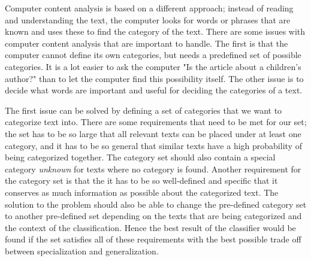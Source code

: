 \documentclass[english,a4paper]{ifimaster}
\begin{document}

Computer content analysis is based on a different approach; instead of reading and understanding the text, the computer looks for words or phrases that are known and uses these to find the category of the text. There are some issues with computer content analysis that are important to handle. The first is that the computer cannot define its own categories, but needs a predefined set of possible categories. It is a lot easier to ask the computer "Is the article about a children's author?" than to let the computer find this possibility itself. The other issue is to decide what words are important and useful for deciding the categories of a text. 

The first issue can be solved by defining a set of categories that we want to categorize text into. There are some requirements that need to be met for our set; the set has to be so large that all relevant texts can be placed under at least one category, and it has to be so general that similar texts have a high probability of being categorized together. The category set should also contain a special category \textit{unknown} for texts where no category is found. Another requirement for the category set is that the it has to be so well-defined and specific that it conserves as much information as possible about the categorized text. The solution to the problem should also be able to change the pre-defined category set to another pre-defined set depending on the texts that are being categorized and the context of the classification.
Hence the best result of the classifier would be found if the set satisfies all of these requirements with the best possible trade off between specialization and generalization. 
\end{document}

